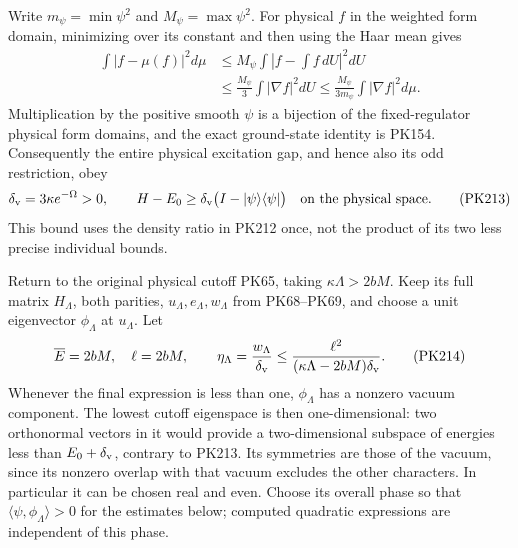 \documentclass[11pt]{article}
\begin{document}
Write \(m_\psi=\min\psi^2\) and \(M_\psi=\max\psi^2\).
For physical \(f\) in the weighted form domain, minimizing
over its constant and then using the Haar mean gives
\[
 \begin{split}
 \int|f-\mu(f)|^2d\mu
 &\le M_\psi\int|f-\textstyle\int f\,dU|^2dU\\
 &\le \frac{M_\psi}{3}\int|\nabla f|^2dU
 \le\frac{M_\psi}{3m_\psi}
                              \int|\nabla f|^2d\mu .
 \end{split}
\]
Multiplication by the positive smooth \(\psi\) is a bijection
of the fixed-regulator physical form domains, and the exact
ground-state identity is PK154. Consequently the entire
physical excitation gap, and hence also its odd restriction,
obey
\[
 \delta_{\rm v}=3\kappa e^{-\Omega}>0,\qquad
 H-E_0\ge\delta_{\rm v}
          \bigl(I-|\psi\rangle\langle\psi|\bigr)
       \quad\hbox{on the physical space}.
 \tag{PK213}
\]
This bound uses the density ratio in PK212 once, not the
product of its two less precise individual bounds.

Return to the original physical cutoff PK65, taking
\(\kappa\Lambda>2bM\). Keep its full matrix \(H_\Lambda\),
both parities, \(u_\Lambda,e_\Lambda,w_\Lambda\) from
PK68--PK69, and choose a unit eigenvector \(\phi_\Lambda\)
at \(u_\Lambda\). Let
\[
 \overline E=2bM,\quad \ell=2bM,\qquad
 \eta_\Lambda=\frac{w_\Lambda}{\delta_{\rm v}}
 \le\frac{\ell^2}
          {(\kappa\Lambda-2bM)\delta_{\rm v}} .
 \tag{PK214}
\]
Whenever the final expression is less than one,
\(\phi_\Lambda\) has a nonzero vacuum component. The lowest
cutoff eigenspace is then one-dimensional: two orthonormal
vectors in it would provide a two-dimensional subspace of
energies less than \(E_0+\delta_{\rm v}\), contrary to PK213.
Its symmetries are those of the vacuum, since its nonzero
overlap with that vacuum excludes the other characters.
In particular it can be chosen real and even. Choose its
overall phase so that \(\langle\psi,\phi_\Lambda\rangle>0\)
for the estimates below; computed quadratic expressions are
independent of this phase.
\end{document}
